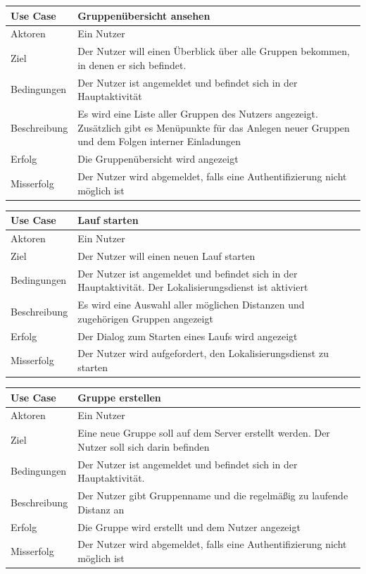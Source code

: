 \begin{tabular}{|p{}|p{}|}
\hline
\textbf{Use Case} & \textbf{Gruppenübersicht ansehen} \\ \hline
Aktoren &  Ein Nutzer \\ \hline
Ziel &  Der Nutzer will einen Überblick über alle Gruppen bekommen, in denen er sich befindet. \\ \hline
Bedingungen &  Der Nutzer ist angemeldet und befindet sich in der Hauptaktivität\\ \hline
Beschreibung &  Es wird eine Liste aller Gruppen des Nutzers angezeigt. Zusätzlich gibt es Menüpunkte für das Anlegen neuer Gruppen und dem Folgen interner Einladungen \\ \hline
Erfolg & Die Gruppenübersicht wird angezeigt \\ \hline
Misserfolg & Der Nutzer wird abgemeldet, falls eine Authentifizierung nicht möglich ist \\ \hline
\hline \end{tabular}
\begin{tabular}{|p{}|p{}|}
\hline
\textbf{Use Case} & \textbf{Lauf starten} \\ \hline
Aktoren &  Ein Nutzer \\ \hline
Ziel &  Der Nutzer will einen neuen Lauf starten \\ \hline
Bedingungen &  Der Nutzer ist angemeldet und befindet sich in der Hauptaktivität. Der Lokalisierungsdienst ist aktiviert \\ \hline
Beschreibung &  Es wird eine Auswahl aller möglichen Distanzen und zugehörigen Gruppen angezeigt\\ \hline
Erfolg & Der Dialog zum Starten eines Laufs wird angezeigt \\ \hline
Misserfolg & Der Nutzer wird aufgefordert, den Lokalisierungsdienst zu starten \\ \hline
\hline \end{tabular}
\begin{tabular}{|p{}|p{}|}
\hline
\textbf{Use Case} & \textbf{Gruppe erstellen} \\ \hline
Aktoren &  Ein Nutzer \\ \hline
Ziel &  Eine neue Gruppe soll auf dem Server erstellt werden. Der Nutzer soll sich darin befinden \\ \hline
Bedingungen &  Der Nutzer ist angemeldet und befindet sich in der Hauptaktivität. \\ \hline
Beschreibung &  Der Nutzer gibt Gruppenname und die regelmäßig zu laufende Distanz an \\ \hline
Erfolg & Die Gruppe wird erstellt und dem Nutzer angezeigt \\ \hline
Misserfolg & Der Nutzer wird abgemeldet, falls eine Authentifizierung nicht möglich ist \\ \hline
\hline \end{tabular}
